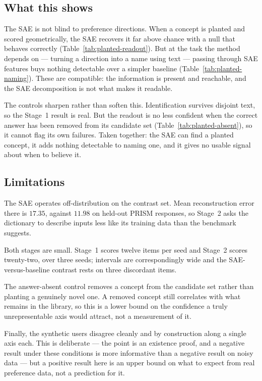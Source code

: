 \subsection{What this shows}

The SAE is not blind to preference directions. When a concept is planted and
scored geometrically, the SAE recovers it far above chance with a null that
behaves correctly (Table~\ref{tab:planted-readout}). But at the task the method
depends on --- turning a direction into a name using text --- passing through
SAE features buys nothing detectable over a simpler baseline
(Table~\ref{tab:planted-naming}). These are compatible: the information is
present and reachable, and the SAE decomposition is not what makes it readable.

The controls sharpen rather than soften this. Identification survives disjoint
text, so the Stage~1 result is real. But the readout is no less confident when
the correct answer has been removed from its candidate set
(Table~\ref{tab:planted-absent}), so it cannot flag its own failures. Taken
together: the SAE can find a planted concept, it adds nothing detectable to
naming one, and it gives no usable signal about when to believe it.

\subsection{Limitations}

The SAE operates off-distribution on the contrast set. Mean reconstruction error
there is $17.35$, against $11.98$ on held-out PRISM responses, so Stage~2 asks
the dictionary to describe inputs less like its training data than the
benchmark suggests.

Both stages are small. Stage~1 scores twelve items per seed and Stage~2 scores
twenty-two, over three seeds; intervals are correspondingly wide and the
SAE-versus-baseline contrast rests on three discordant items.

The answer-absent control removes a concept from the candidate set rather than
planting a genuinely novel one. A removed concept still correlates with what
remains in the library, so this is a lower bound on the confidence a truly
unrepresentable axis would attract, not a measurement of it.

Finally, the synthetic users disagree cleanly and by construction along a single
axis each. This is deliberate --- the point is an existence proof, and a
negative result under these conditions is more informative than a negative
result on noisy data --- but a positive result here is an upper bound on what to
expect from real preference data, not a prediction for it.

